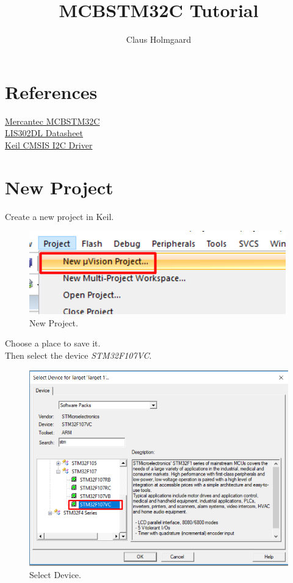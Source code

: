 \documentclass{article}
\title{MCBSTM32C Tutorial}
\author{Claus Holmgaard}
\date{}
\begin{document}
\maketitle

\newpage
{}

\section{References}
\href{http://mars.merhot.dk/w/index.php/MCBSTM32C}{Mercantec MCBSTM32C}\\
\href{http://www.st.com/content/ccc/resource/technical/document/datasheet/63/67/d2/6d/88/e0/4e/39/CD00135460.pdf/files/CD00135460.pdf/jcr:content/translations/en.CD00135460.pdf}{LIS302DL Datasheet}\\
\href{http://www.keil.com/pack/doc/CMSIS/Driver/html/group__i2c__interface__gr.html}{Keil CMSIS I2C Driver}

\section{New Project}

Create a new project in Keil.
\begin{figure}[H]
    \centering
    \includegraphics[width=0.8\linewidth]{pics/NewProject.png}
    \caption{New Project.}
    \label{fig:NewProject}
\end{figure}

Choose a place to save it.\\
Then select the device \textit{STM32F107VC}.
\begin{figure}[H]
    \centering
    \includegraphics[width=0.8\linewidth]{pics/SelectDevice.png}
    \caption{Select Device.}
    \label{fig:SelectDevice}
\end{figure}
\end{document}
